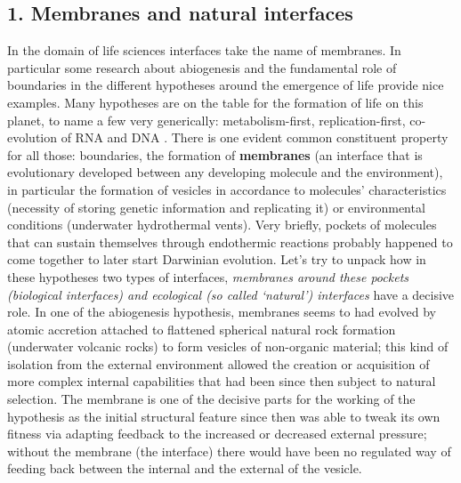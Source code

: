 \documentclass[14pt,a4paper]{extarticle}
\begin{document}
\subsection*{1. Membranes and natural interfaces}
\label{subsec:membranes}
    
\hspace*{15mm}In the domain of life sciences interfaces take the name of membranes. In particular some research about abiogenesis and the fundamental role of boundaries in the different hypotheses around the emergence of life provide nice examples.
\newline
\hspace*{15mm}Many hypotheses are on the table for the formation of life on this planet, to name a few very generically: metabolism-first, replication-first, co-evolution of RNA and DNA \cite{lingam2021life}. There is one evident common constituent property for all those: boundaries, the formation of \textbf{membranes} (an interface that is evolutionary developed between any developing molecule and the environment), in particular the formation of vesicles in accordance to molecules’ characteristics (necessity of storing genetic information and replicating it) or environmental conditions (underwater hydrothermal vents). Very briefly, pockets of molecules that can sustain themselves through endothermic reactions probably happened to come together to later start Darwinian evolution.
\newline
\hspace*{15mm}Let’s try to unpack how in these hypotheses two types of interfaces, \textit{membranes around these pockets (biological interfaces) and ecological (so called ‘natural’) interfaces} have a decisive role. In one of the abiogenesis hypothesis, membranes seems to had evolved by atomic accretion attached to flattened spherical natural rock formation (underwater volcanic rocks) to form vesicles of non-organic material; this kind of isolation from the external environment allowed the creation or acquisition of more complex internal capabilities that had been since then subject to natural selection.
\newline
The membrane is one of the decisive parts for the working of the hypothesis \cite{lingam2021life} as the initial structural feature since then was able to tweak its own fitness via adapting feedback to the increased or decreased external pressure; without the membrane (the interface) there would have been no regulated way of feeding back between the internal and the external of the vesicle.
\newline
\end{document}

